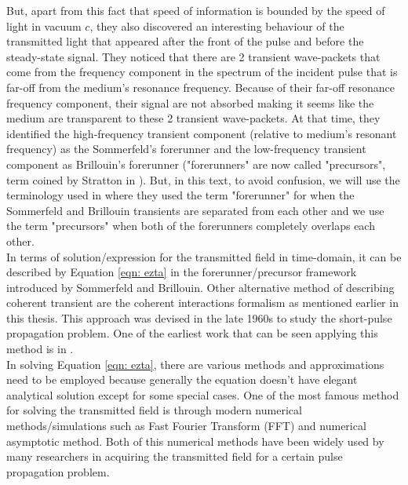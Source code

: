 But, apart from this fact that speed of information is bounded by the speed of light in vacuum $c$, they also discovered an interesting behaviour of the transmitted light that appeared after the front of the pulse and before the steady-state signal. They noticed that there are 2 transient wave-packets that come from the frequency component in the spectrum of the incident pulse that is far-off from the medium's resonance frequency. Because of their far-off resonance frequency component, their signal are not absorbed making it seems like the medium are transparent to these 2 transient wave-packets. At that time, they identified the high-frequency transient component (relative to medium's resonant frequency) as the Sommerfeld's forerunner and the low-frequency transient component as Brillouin's forerunner ("forerunners" are now called "precursors", term coined by Stratton in \cite{Stratton1941}). But, in this text, to avoid confusion, we will use the terminology used in \cite{Macke2013} where they used the term "forerunner" for when the Sommerfeld and Brillouin transients are separated from each other and we use the term "precursors" when both of the forerunners completely overlaps each other.\\

In terms of solution/expression for the transmitted field in time-domain, it can be described by Equation \ref{eqn: ezta} in the forerunner/precursor framework introduced by Sommerfeld and Brillouin. Other alternative method of describing coherent transient are the coherent interactions formalism as mentioned earlier in this thesis. This approach was devised in the late 1960s to study the short-pulse propagation problem. One of the earliest work that can be seen applying this method is in \cite{Crisp1970}.\\

In solving Equation \ref{eqn: ezta}, there are various methods and approximations need to be employed because generally the equation doesn't have elegant analytical solution except for some special cases. One of the most famous method for solving the transmitted field  is through modern numerical methods/simulations such as Fast Fourier Transform (FFT) and numerical asymptotic method. Both of this numerical methods have been widely used by many researchers in acquiring the transmitted field for a certain pulse propagation problem.\\

